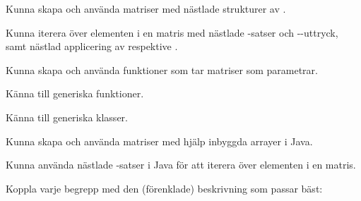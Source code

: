 

\ifPreSolution

\Exercise{\ExeWeekEIGHT}\label{exe:W08}

\begin{Goals}
\item Kunna skapa och använda matriser med nästlade strukturer av .
\item Kunna iterera över elementen i en matris med nästlade -satser och --uttryck, samt nästlad applicering av  respektive .
\item Kunna skapa och använda funktioner som tar matriser som parametrar.
\item Känna till generiska funktioner.
\item Känna till generiska klasser.
\item Kunna skapa och använda matriser med hjälp inbyggda arrayer i Java.
\item Kunna använda nästlade -satser i Java för att iterera över elementen i en matris.
\end{Goals}

\begin{Preparations}
\item {}
\end{Preparations}

\BasicTasks

\else

\ExerciseSolution{\ExeWeekEIGHT}

\BasicTasks

\fi




\QUESTBEGIN

\Task \what

\vspace{1em}\noindent Koppla varje begrepp med den (förenklade) beskrivning som passar bäst:

\begin{ConceptConnections}

\end{ConceptConnections}

\SOLUTION

\TaskSolved \what

\begin{ConceptConnections}

\end{ConceptConnections}

